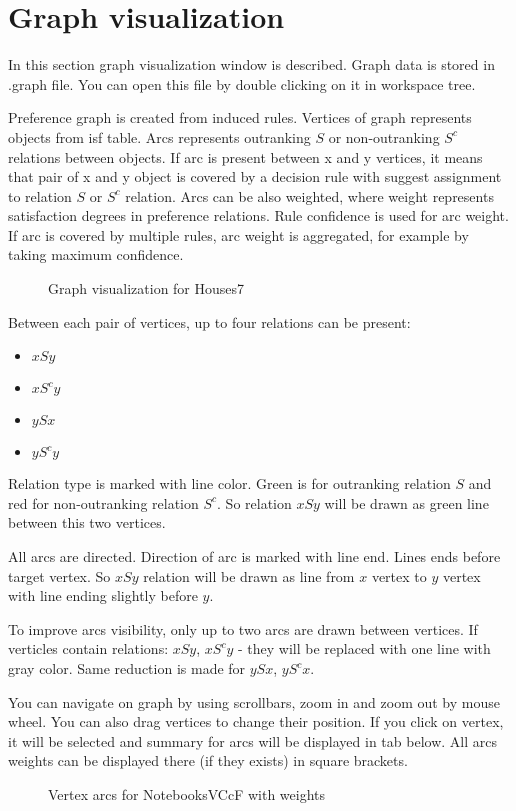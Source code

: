 \section{Graph visualization}\label{section:graph}

In this section graph visualization window is described. Graph data is stored in .graph file. 
You can open this file by double clicking on it in workspace tree.

Preference graph is created from induced rules. Vertices of graph represents objects from isf table. 
Arcs represents outranking $S$ or non-outranking $S^{c}$ relations between objects. 
If arc is present between x and y vertices, it means that pair of x and y object is covered by a decision rule with suggest assignment to relation $S$ or $S^{c}$ relation. 
Arcs can be also weighted, where weight represents satisfaction degrees in preference relations.
Rule confidence is used for arc weight. 
If arc is covered by multiple rules, arc weight is aggregated, for example by taking maximum confidence.

\begin{figure*}[!ht] 
	\centering
	\caption{Graph visualization for Houses7}
\end{figure*}

Between each pair of vertices, up to four relations can be present:
\begin{itemize}
	\item $x S y$
	\item $x S^{c} y$
	\item $y S x$
	\item $y S^{c} y$
\end{itemize}

Relation type is marked with line color. Green is for outranking relation $S$ and red for non-outranking relation $S^{c}$. So relation $x S y$ will be drawn as green line between this two vertices.

All arcs are directed. Direction of arc is marked with line end. Lines ends before target vertex. So $x S y$ relation will be drawn as line from $x$ vertex to $y$ vertex with line ending slightly before $y$.

To improve arcs visibility, only up to two arcs are drawn between vertices. If verticles contain relations: $x S y$, $x S^{c} y$ - they will be replaced with one line with gray color. 
Same reduction is made for $y S x$, $y S^{c} x$.

You can navigate on graph by using scrollbars, zoom in and zoom out by mouse wheel. You can also drag vertices to change their position. If you click on vertex, it will be selected and summary for arcs will be displayed in tab below. All arcs weights can be displayed there (if they exists) in square brackets.

\begin{figure*}[!ht] 
	\centering
	\caption{Vertex arcs for NotebooksVCcF with weights}
\end{figure*}


\vfill\newpage